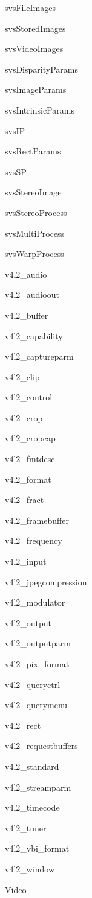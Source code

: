 \begin{CompactList}
\begin{CompactList}
\item svs\-File\-Images\item svs\-Stored\-Images\item svs\-Video\-Images\end{CompactList}
\item svs\-Disparity\-Params\item svs\-Image\-Params\item svs\-Intrinsic\-Params\item svs\-IP\item svs\-Rect\-Params\item svs\-SP\item svs\-Stereo\-Image\item svs\-Stereo\-Process\begin{CompactList}
\item svs\-Multi\-Process\end{CompactList}
\item svs\-Warp\-Process\item v4l2\_\-audio\item v4l2\_\-audioout\item v4l2\_\-buffer\item v4l2\_\-capability\item v4l2\_\-captureparm\item v4l2\_\-clip\item v4l2\_\-control\item v4l2\_\-crop\item v4l2\_\-cropcap\item v4l2\_\-fmtdesc\item v4l2\_\-format\item v4l2\_\-fract\item v4l2\_\-framebuffer\item v4l2\_\-frequency\item v4l2\_\-input\item v4l2\_\-jpegcompression\item v4l2\_\-modulator\item v4l2\_\-output\item v4l2\_\-outputparm\item v4l2\_\-pix\_\-format\item v4l2\_\-queryctrl\item v4l2\_\-querymenu\item v4l2\_\-rect\item v4l2\_\-requestbuffers\item v4l2\_\-standard\item v4l2\_\-streamparm\item v4l2\_\-timecode\item v4l2\_\-tuner\item v4l2\_\-vbi\_\-format\item v4l2\_\-window\item Video\begin{CompactList}

\end{CompactList}
\end{CompactList}
